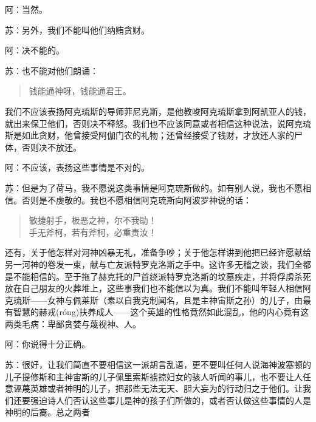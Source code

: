 \documentclass[11pt,oneside]{book}
\begin{document}
\begin{common-format}
阿：当然。

苏：另外，我们不能叫他们纳贿贪财。

阿：决不能的。

苏：也不能对他们朗诵：
\begin{verse}
钱能通神呀，钱能通君王。
\end{verse}
我们不应该表扬阿克琉斯的导师菲尼克斯，是他教唆阿克琉斯拿到阿凯亚人的钱，就出来保卫他们，否则决不释怒。我们也不应该同意或者相信这种说法，说阿克琉斯是如此贪财，他曾接受阿伽门农的礼物；还曾经接受了钱财，才放还人家的尸体，否则决不放还。

阿：不应该，表扬这些事情是不对的。

苏：但是为了荷马，我不愿说这类事情是阿克琉斯做的。如有别人说，我也不愿相信。否则是不虔敬的。我也不愿相信阿克琉斯向阿波罗神说的话：
\begin{verse}
敏捷射手，极恶之神，尔不我助！\\
手无斧柯，若有斧柯，必重责汝！
\end{verse}
还有，关于他怎样对河神凶暴无礼，准备争吵；关于他怎样讲到他把已经许愿献给另一河神的卷发一束，献与亡友派特罗克洛斯之手中。这许多无稽之谈，我们全都是不能相信的。至于拖了赫克托的尸首绕派特罗克洛斯的坟墓疾走，并将俘虏杀死放在自己朋友的火葬堆上，这些事我们也不能信以为真。我们不能叫年轻人相信阿克琉斯——女神与佩莱斯（素以自我克制闻名，且是主神宙斯之孙）的儿子，由最有智慧的赫戎(róng)扶养成人——这个英雄的性格竟然如此混乱，他的内心竟有这两类毛病：卑鄙贪婪与蔑视神、人。

阿：你说得十分正确。

苏：很好，让我们简直不要相信这一派胡言乱语，更不要叫任何人说海神波塞顿的儿子提修斯和主神宙斯的儿子佩里索斯掳掠妇女的骇人听闻的事儿，也不要让人任意诬蔑英雄或者神明的儿子，把那些无法无天、胆大妄为的行动归之于他们。让我们还要强迫诗人们否认这些事儿是神的孩子们所做的，或者否认做这些事情的人是神明的后裔。总之两者



\end{common-format}  
\end{document}
